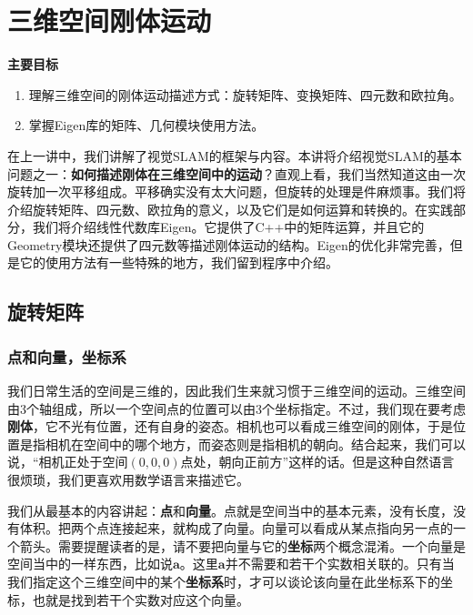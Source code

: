 \chapter{三维空间刚体运动}

\begin{mdframed}  
	\textbf{主要目标}
	\begin{enumerate}[labelindent=0em,leftmargin=1.5em]
		\item 理解三维空间的刚体运动描述方式：旋转矩阵、变换矩阵、四元数和欧拉角。
		\item 掌握Eigen库的矩阵、几何模块使用方法。
	\end{enumerate}
\end{mdframed} 

在上一讲中，我们讲解了视觉SLAM的框架与内容。本讲将介绍视觉SLAM的基本问题之一：\textbf{如何描述刚体在三维空间中的运动}？直观上看，我们当然知道这由一次旋转加一次平移组成。平移确实没有太大问题，但旋转的处理是件麻烦事。我们将介绍旋转矩阵、四元数、欧拉角的意义，以及它们是如何运算和转换的。在实践部分，我们将介绍线性代数库Eigen。它提供了C++中的矩阵运算，并且它的Geometry模块还提供了四元数等描述刚体运动的结构。Eigen的优化非常完善，但是它的使用方法有一些特殊的地方，我们留到程序中介绍。

\newpage


\newpage

\section{旋转矩阵}
\label{sec:rigidMotion}
\subsection{点和向量，坐标系}
我们日常生活的空间是三维的，因此我们生来就习惯于三维空间的运动。三维空间由3个轴组成，所以一个空间点的位置可以由3个坐标指定。不过，我们现在要考虑\textbf{刚体}，它不光有位置，还有自身的姿态。相机也可以看成三维空间的刚体，于是位置是指相机在空间中的哪个地方，而姿态则是指相机的朝向。结合起来，我们可以说，“相机正处于空间$(0,0,0)$点处，朝向正前方”这样的话。但是这种自然语言很烦琐，我们更喜欢用数学语言来描述它。

我们从最基本的内容讲起：\textbf{点}和\textbf{向量}。点就是空间当中的基本元素，没有长度，没有体积。把两个点连接起来，就构成了向量。向量可以看成从某点指向另一点的一个箭头。需要提醒读者的是，请不要把向量与它的\textbf{坐标}两个概念混淆。一个向量是空间当中的一样东西，比如说$\bm{a}$。这里$\bm{a}$并不需要和若干个实数相关联的。只有当我们指定这个三维空间中的某个\textbf{坐标系}时，才可以谈论该向量在此坐标系下的坐标，也就是找到若干个实数对应这个向量。

